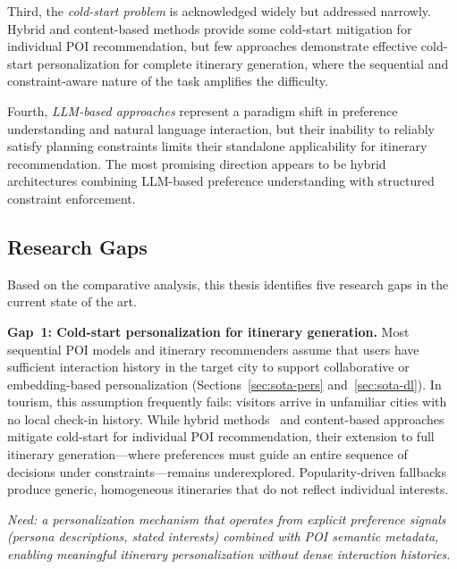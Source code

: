 Third, the \emph{cold-start problem} is acknowledged widely but addressed narrowly. Hybrid and content-based methods provide some cold-start mitigation for individual POI recommendation, but few approaches demonstrate effective cold-start personalization for complete itinerary generation, where the sequential and constraint-aware nature of the task amplifies the difficulty.

Fourth, \emph{LLM-based approaches} represent a paradigm shift in preference understanding and natural language interaction, but their inability to reliably satisfy planning constraints limits their standalone applicability for itinerary recommendation. The most promising direction appears to be hybrid architectures combining LLM-based preference understanding with structured constraint enforcement.

\subsection{Research Gaps}
\label{sec:sota-synth-gaps}

Based on the comparative analysis, this thesis identifies five research gaps in the current state of the art.

\medskip

\textbf{Gap~1: Cold-start personalization for itinerary generation.}
Most sequential POI models and itinerary recommenders assume that users have sufficient interaction history in the target city to support collaborative or embedding-based personalization (Sections~\ref{sec:sota-pers} and~\ref{sec:sota-dl}). In tourism, this assumption frequently fails: visitors arrive in unfamiliar cities with no local check-in history. While hybrid methods~\cite{burke2002hybrid} and content-based approaches~\cite{chen2019description} mitigate cold-start for individual POI recommendation, their extension to full itinerary generation---where preferences must guide an entire sequence of decisions under constraints---remains underexplored. Popularity-driven fallbacks produce generic, homogeneous itineraries that do not reflect individual interests.

\textit{Need: a personalization mechanism that operates from explicit preference signals (persona descriptions, stated interests) combined with POI semantic metadata, enabling meaningful itinerary personalization without dense interaction histories.}

